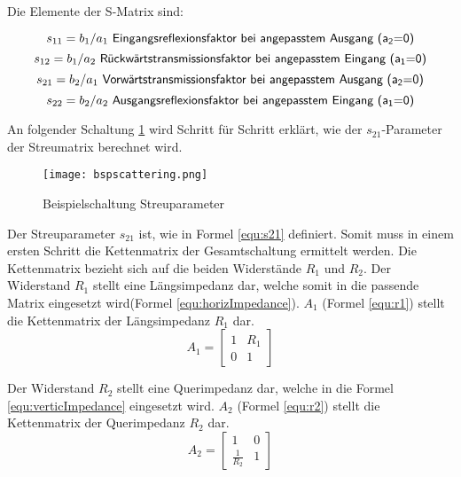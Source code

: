 Die Elemente der S-Matrix sind:

\begin{equation}\label{equ:def_s11}
	s_{11} = b_1/a_1\textsf{ Eingangsreflexionsfaktor bei angepasstem Ausgang (a\textsubscript{2}=0)}
\end{equation}
\begin{equation}\label{equ:def_s12}
	s_{12} = b_1/a_2\textsf{ Rückwärtstransmissionsfaktor bei angepasstem Eingang (a\textsubscript{1}=0)}
\end{equation}
\begin{equation}\label{equ:def_s21}
	s_{21} = b_2/a_1\textsf{ Vorwärtstransmissionsfaktor bei angepasstem Ausgang (a\textsubscript{2}=0)}
\end{equation}
\begin{equation}\label{equ:def_s22}
	s_{22} = b_2/a_2\textsf{ Ausgangsreflexionsfaktor bei angepasstem Eingang (a\textsubscript{1}=0)}
\end{equation}

An folgender Schaltung \ref{fig:bspscattering} wird Schritt für Schritt erklärt, wie der $s_{21}$-Parameter der Streumatrix berechnet wird. 
\begin{figure}[H]
	\centering
	\texttt{[image: bspscattering.png]}
	\caption{Beispielschaltung Streuparameter}
	\label{fig:bspscattering}
\end{figure}
Der Streuparameter $s_{21}$ ist, wie in Formel \ref{equ:s21} definiert. Somit muss in einem ersten Schritt die Kettenmatrix der Gesamtschaltung ermittelt werden. Die Kettenmatrix bezieht sich auf die beiden Widerstände $R_1$ und $R_2$. Der Widerstand $R_1$ stellt eine Längsimpedanz dar, welche somit in die passende Matrix eingesetzt wird(Formel \ref{equ:horizImpedance}). $A_1$ (Formel \ref{equ:r1}) stellt die Kettenmatrix der Längsimpedanz $R_1$ dar.
\begin{equation}\label{equ:r1}
	A_1 = \left[\begin{matrix}
			1&R_1\\0&1
			\end{matrix}\right]
\end{equation}

Der Widerstand $R_2$ stellt eine Querimpedanz dar, welche in die Formel \ref{equ:verticImpedance} eingesetzt wird. $A_2$ (Formel \ref{equ:r2}) stellt die Kettenmatrix der Querimpedanz $R_2$ dar.
\begin{equation}\label{equ:r2}
			A_2 = \left[\begin{matrix}
			1&0\\\frac{1}{R_2}&1
			\end{matrix}\right]
\end{equation}

